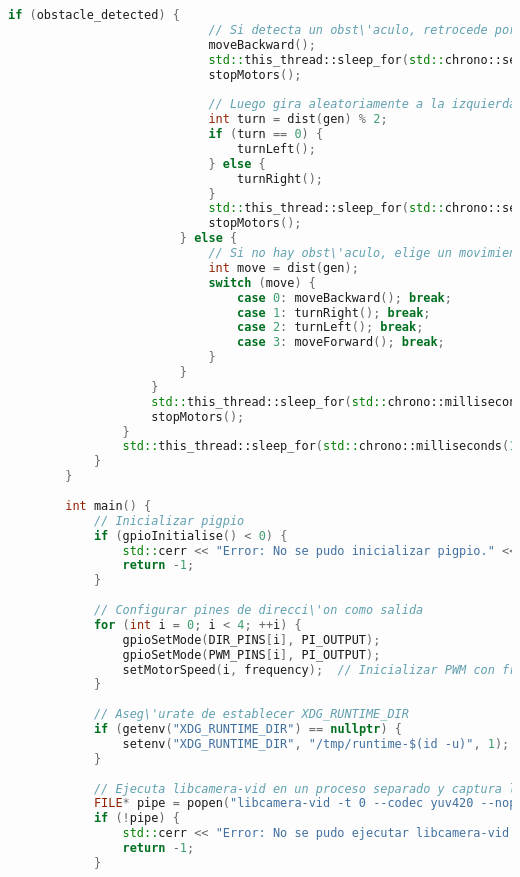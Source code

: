 \begin{lstlisting}[language={C++}, caption={Primera versi\'on del c\'odigo del sistema de control del robot}, label={Script}]
                        if (obstacle_detected) {
                            // Si detecta un obst\'aculo, retrocede por 4 segundos
                            moveBackward();
                            std::this_thread::sleep_for(std::chrono::seconds(4));
                            stopMotors();
        
                            // Luego gira aleatoriamente a la izquierda o derecha
                            int turn = dist(gen) % 2;
                            if (turn == 0) {
                                turnLeft();
                            } else {
                                turnRight();
                            }
                            std::this_thread::sleep_for(std::chrono::seconds(2));
                            stopMotors();
                        } else {
                            // Si no hay obst\'aculo, elige un movimiento aleatorio
                            int move = dist(gen);
                            switch (move) {
                                case 0: moveBackward(); break;
                                case 1: turnRight(); break;
                                case 2: turnLeft(); break;
                                case 3: moveForward(); break;
                            }
                        }
                    }
                    std::this_thread::sleep_for(std::chrono::milliseconds(500));
                    stopMotors();
                }
                std::this_thread::sleep_for(std::chrono::milliseconds(100));
            }
        }
        
        int main() {
            // Inicializar pigpio
            if (gpioInitialise() < 0) {
                std::cerr << "Error: No se pudo inicializar pigpio." << std::endl;
                return -1;
            }
        
            // Configurar pines de direcci\'on como salida
            for (int i = 0; i < 4; ++i) {
                gpioSetMode(DIR_PINS[i], PI_OUTPUT);
                gpioSetMode(PWM_PINS[i], PI_OUTPUT);
                setMotorSpeed(i, frequency);  // Inicializar PWM con frecuencia inicial
            }
        
            // Aseg\'urate de establecer XDG_RUNTIME_DIR
            if (getenv("XDG_RUNTIME_DIR") == nullptr) {
                setenv("XDG_RUNTIME_DIR", "/tmp/runtime-$(id -u)", 1);
            }
        
            // Ejecuta libcamera-vid en un proceso separado y captura la salida en YUV, sin previsualizaci\'on
            FILE* pipe = popen("libcamera-vid -t 0 --codec yuv420 --nopreview -o -", "r");
            if (!pipe) {
                std::cerr << "Error: No se pudo ejecutar libcamera-vid." << std::endl;
                return -1;
            }
        

\end{lstlisting}

